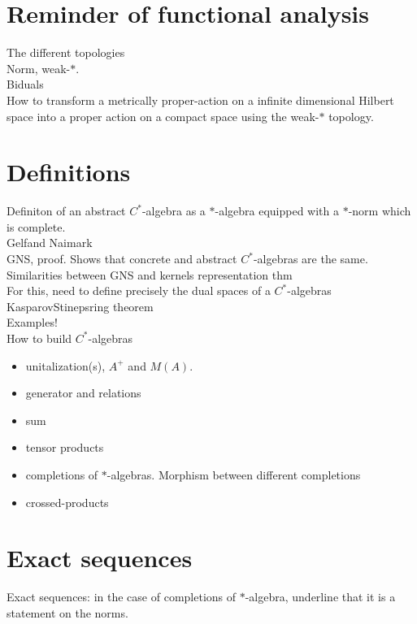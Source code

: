 \section{Reminder of functional analysis}

The different topologies\\
Norm, weak-$*$.\\
Biduals\\

How to transform a metrically proper-action on a infinite dimensional Hilbert space into a proper action on a compact space using the weak-$*$ topology.

\section{Definitions}

Definiton of an abstract $C^*$-algebra as a $*$-algebra equipped with a $*$-norm which is complete.\\

Gelfand Naimark \\
GNS, proof. Shows that concrete and abstract $C^*$-algebras are the same. \\
Similarities between GNS and kernels representation thm\\
For this, need to define precisely the dual spaces of a $C^*$-algebras\\

KasparovStinepsring theorem\\


Examples!\\

How to build $C^*$-algebras
\begin{itemize}
\item unitalization(s), $A^+$ and $M(A)$.
\item generator and relations
\item sum
\item tensor products
\item completions of $*$-algebras. Morphism between different completions
\item crossed-products
\end{itemize}

\section{Exact sequences}

Exact sequences: in the case of completions of $*$-algebra, underline that it is a statement on the norms.\\

